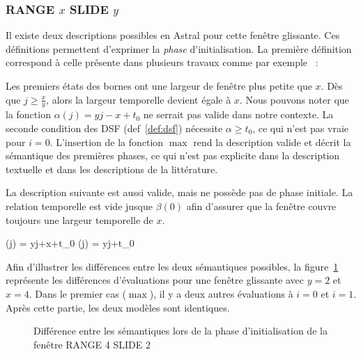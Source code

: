 \subsubsection{RANGE $x$ SLIDE $y$}
Il existe deux descriptions possibles en Astral pour cette fenêtre glissante. Ces définitions permettent d'exprimer la \textit{phase} d'initialisation. La première définition correspond à celle présente dans plusieurs travaux comme par exemple~\cite{Jain:spread} :


Les premiers états des bornes ont une largeur de fenêtre plus petite que $x$. Dès que $j \geq \frac xy$, alors la largeur temporelle devient égale à $x$. Nous pouvons noter que la fonction $\alpha(j) = yj-x+t_0$ ne serrait pas valide dans notre contexte. La seconde condition des DSF (def~\ref{def:dsf}) nécessite $\alpha \geq t_0$, ce qui n'est pas vraie pour $i=0$. L'insertion de la fonction $\max$ rend la description valide et décrit la sémantique des premières phases, ce qui n'est pas explicite dans la description textuelle et dans les descriptions de la littérature.

La description suivante est aussi valide, mais ne possède pas de phase initiale. La relation temporelle est vide jusque $\beta(0)$ afin d'assurer que la fenêtre couvre toujours une largeur temporelle de $x$.

	{\beta(j) = yj+x+t_0}
	{\alpha(j) = yj+t_0}

Afin d'illustrer les différences entre les deux sémantiques possibles, la figure~\ref{fig:valid:expressivite:slidemax} représente les différences d'évaluations pour une fenêtre glissante avec $y=2$ et $x=4$. Dans le premier cas ($\max$), il y a deux autres évaluations à $i=0$ et $i=1$. Après cette partie, les deux modèles sont identiques.

\begin{figure}[ht]
\centering
\def\lgrad#1{\draw [thick] (#1,0) -- (#1,-0.2); \node [below] at (#1,-0.2){#1};}
\def\seg#1#2#3#4#5{\draw [thick] (#1#40.1,#3+0.25) -- (#1,#3+0.25) -- (#1,#3-0.25) -- (#1#40.1,#3-0.25); \draw [thick] (#1,#3) -- (#2,#3); \draw [thick] (#2#50.1,#3+0.25) -- (#2,#3+0.25) -- (#2,#3-0.25) -- (#2#50.1,#3-0.25);}
\def\seglbl#1#2#3#4#5#6{\seg{#1}{#2}{#3}{#4}{#5}\node [above] at (0.5*#1+0.5*#2,#3){#6};}
\caption{Différence entre les sémantiques lors de la phase d'initialisation de la fenêtre RANGE 4 SLIDE 2}\label{fig:valid:expressivite:slidemax}
\end{figure}


